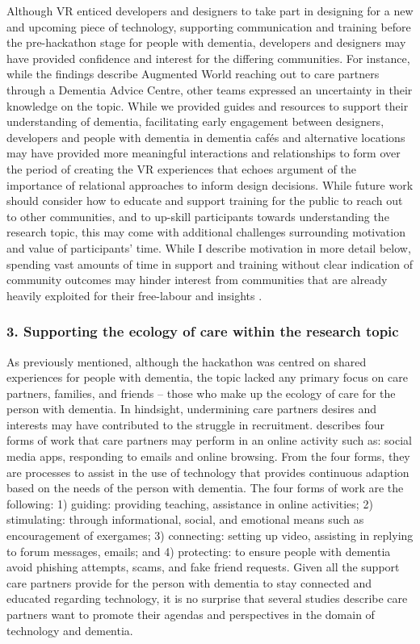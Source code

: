 Although VR enticed developers and designers to take part in designing for a new and upcoming piece of technology, supporting communication and training before the pre-hackathon stage for people with dementia, developers and designers may have provided confidence and interest for the differing communities. For instance, while the findings describe Augmented World reaching out to care partners through a Dementia Advice Centre, other teams expressed an uncertainty in their knowledge on the topic. While we provided guides and resources to support their understanding of dementia, facilitating early engagement between designers, developers and people with dementia in dementia cafés and alternative locations may have provided more meaningful interactions and relationships to form over the period of creating the VR experiences that echoes \cite{hendriks_valuing_2018} argument of the importance of relational approaches to inform design decisions. While future work should consider how to educate and support training for the public to reach out to other communities, and to up-skill participants towards understanding the research topic, this may come with additional challenges surrounding motivation and value of participants’ time. While I describe motivation in more detail below, spending vast amounts of time in support and training without clear indication of community outcomes may hinder interest from communities that are already heavily exploited for their free-labour and insights \cite{medina_angarita_what_2020}.


\subsubsection{3. Supporting the ecology of care within the research topic}
\label{ecologyOfCare}
As previously mentioned, although the hackathon was centred on shared experiences for people with dementia, the topic lacked any primary focus on care partners, families, and friends – those who make up the ecology of care for the person with dementia. In hindsight, undermining care partners desires and interests may have contributed to the struggle in recruitment.  \cite{piper2016technological} describes four forms of work that care partners may perform in an online activity such as: social media apps, responding to emails and online browsing. From the four forms, they are processes to assist in the use of technology that provides continuous adaption based on the needs of the person with dementia. The four forms of work are the following: 1) guiding: providing teaching, assistance in online activities; 2) stimulating: through informational, social, and emotional means such as encouragement of exergames; 3) connecting: setting up video, assisting in replying to forum messages, emails; and 4) protecting: to ensure people with dementia avoid phishing attempts, scams, and fake friend requests. Given all the support care partners provide for the person with dementia to stay connected and educated regarding technology, it is no surprise that several studies describe care partners want to promote their agendas and perspectives in the domain of technology and dementia. 

